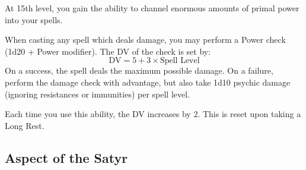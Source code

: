 {
	At 15th level, you gain the ability to channel enormous amounts of primal power into your spells.
	
	When casting any spell which deals damage, you may perform a Power check (1d20 + Power modifier). The DV of the check is set by:
	$$ \text{DV} = 5 + 3\times\text{Spell Level}$$
	On a success, the spell deals the maximum possible damage. On a failure, perform the damage check with advantage, but also take 1d10 psychic damage (ignoring resistances or immunities) per spell level. 
	
	Each time you use this ability, the DV increases by 2. This is reset upon taking a Long Rest. 
}


\subsection{Aspect of the Satyr}



 
